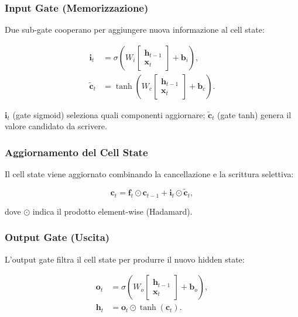 \subsubsection{Input Gate (Memorizzazione)}
\label{subsubsec:input-gate}

Due sub-gate cooperano per aggiungere nuova informazione al cell state:

\begin{align}
  \mathbf{i}_t &= \sigma\!\left(W_i \begin{bmatrix}\mathbf{h}_{t-1}\\
                    \mathbf{x}_t\end{bmatrix} + \mathbf{b}_i\right),
  \label{eq:input-gate} \\
  \tilde{\mathbf{c}}_t &= \tanh\!\left(W_c \begin{bmatrix}\mathbf{h}_{t-1}\\
                    \mathbf{x}_t\end{bmatrix} + \mathbf{b}_c\right).
  \label{eq:candidate-cell}
\end{align}

$\mathbf{i}_t$ (gate sigmoid) seleziona quali componenti aggiornare;
$\tilde{\mathbf{c}}_t$ (gate tanh) genera il valore candidato da scrivere.

\subsubsection{Aggiornamento del Cell State}
\label{subsubsec:cell-update}

Il cell state viene aggiornato combinando la cancellazione e la scrittura
selettiva:

\begin{equation}
  \mathbf{c}_t = \mathbf{f}_t \odot \mathbf{c}_{t-1}
                + \mathbf{i}_t \odot \tilde{\mathbf{c}}_t,
  \label{eq:cell-update}
\end{equation}

dove $\odot$ indica il prodotto element-wise (Hadamard).

\subsubsection{Output Gate (Uscita)}
\label{subsubsec:output-gate}

L'output gate filtra il cell state per produrre il nuovo hidden state:

\begin{align}
  \mathbf{o}_t &= \sigma\!\left(W_o \begin{bmatrix}\mathbf{h}_{t-1}\\
                    \mathbf{x}_t\end{bmatrix} + \mathbf{b}_o\right),
  \label{eq:output-gate} \\
  \mathbf{h}_t &= \mathbf{o}_t \odot \tanh(\mathbf{c}_t).
  \label{eq:hidden-output}
\end{align}

